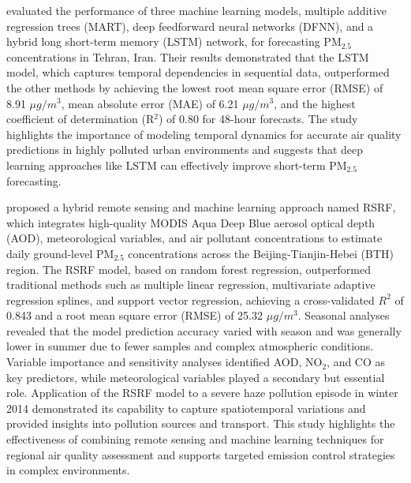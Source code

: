 \documentclass[11pt]{article}
\begin{document}
\citet{karimian2019evaluation} evaluated the performance of three machine learning models, multiple additive regression trees (MART), deep feedforward neural networks (DFNN), and a hybrid long short-term memory (LSTM) network, for forecasting PM$_{2.5}$ concentrations in Tehran, Iran. Their results demonstrated that the LSTM model, which captures temporal dependencies in sequential data, outperformed the other methods by achieving the lowest root mean square error (RMSE) of 8.91 \(\mu g/m^3\), mean absolute error (MAE) of 6.21 \(\mu g/m^3\), and the highest coefficient of determination (R$^2$) of 0.80 for 48-hour forecasts. The study highlights the importance of modeling temporal dynamics for accurate air quality predictions in highly polluted urban environments and suggests that deep learning approaches like LSTM can effectively improve short-term PM$_{2.5}$ forecasting.

\citet{li2019predicting} proposed a hybrid remote sensing and machine learning approach named RSRF, which integrates high-quality MODIS Aqua Deep Blue aerosol optical depth (AOD), meteorological variables, and air pollutant concentrations to estimate daily ground-level PM$_{2.5}$ concentrations across the Beijing-Tianjin-Hebei (BTH) region. The RSRF model, based on random forest regression, outperformed traditional methods such as multiple linear regression, multivariate adaptive regression splines, and support vector regression, achieving a cross-validated \( R^2 \) of 0.843 and a root mean square error (RMSE) of 25.32 \(\mu g/m^3\). Seasonal analyses revealed that the model prediction accuracy varied with season and was generally lower in summer due to fewer samples and complex atmospheric conditions. Variable importance and sensitivity analyses identified AOD, NO$_2$, and CO as key predictors, while meteorological variables played a secondary but essential role. Application of the RSRF model to a severe haze pollution episode in winter 2014 demonstrated its capability to capture spatiotemporal variations and provided insights into pollution sources and transport. This study highlights the effectiveness of combining remote sensing and machine learning techniques for regional air quality assessment and supports targeted emission control strategies in complex environments.
\end{document}
